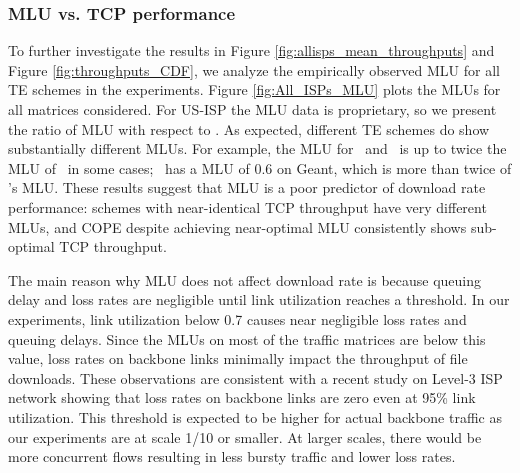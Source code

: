 \subsubsection{MLU vs. TCP performance}

To further investigate the results in Figure \ref{fig:allisps_mean_throughputs} and Figure \ref{fig:throughputs_CDF}, we analyze the empirically observed MLU for all TE schemes in the experiments. Figure \ref{fig:All_ISPs_MLU} plots the MLUs for all matrices considered. For US-ISP the MLU data is proprietary, so we present the ratio of MLU with respect to \opt. As expected, different TE schemes do show substantially different MLUs. For example, the MLU for \invcap\ and \optwt\ is up to twice the MLU of \opt\ in some cases; \mindelay\ has a MLU of 0.6 on Geant, which is more than twice of \opt's MLU. These results suggest that MLU is a poor predictor of download rate performance: schemes with near-identical TCP throughput have very different MLUs, and COPE despite achieving near-optimal MLU consistently shows sub-optimal TCP throughput.


The main reason why MLU does not affect download rate is because queuing delay and loss rates are negligible until link utilization reaches a threshold. In our experiments, link utilization below 0.7 causes near negligible loss rates and queuing delays. Since the MLUs on most of the traffic matrices are below this value, loss rates on backbone links minimally impact the throughput of file downloads.  These observations are consistent with a recent  study on Level-3 ISP network  \cite{ExpRouterBuffer} showing that loss rates on backbone links are zero even at 95\%  link utilization. This threshold is expected to be higher for actual backbone traffic as our experiments are at scale 1/10 or smaller. At larger scales, there would be more concurrent flows resulting in less bursty traffic and lower loss rates.

